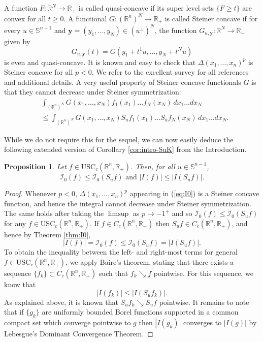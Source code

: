 \documentclass[11pt]{article}
\newtheorem{proposition}[thm]{Proposition}
\theoremstyle{definition}
\theoremstyle{proof}
\DeclareMathOperator{\+}{\mathop{\tilde{+}}}
\newcommand{\R}{\mathbb{R}}
\renewcommand{\S}{\mathbb{S}}
\newcommand{\I}{\mathcal{I}}
\newcommand{\y}{\mathbf{y}}
\newcommand{\usc}{\textrm{USC}}
\numberwithin{equation}{section}
\numberwithin{equation}{section}
\begin{document}
\smallskip

A function $F : \R^N \rightarrow \R_+$ is called quasi-concave if its super level sets $\{F \geq t\}$ are convex for all $t \geq 0$. 
A functional $G : (\R^n)^N \rightarrow \R_+$ is called Steiner concave if for every $u \in \S^{n-1}$ and $\y = (y_1,\ldots,y_N) \in (u^{\perp})^N$, the function $G_{u,\y} : \R^N \rightarrow \R_+$ given by
\[
G_{u,\y}(t) = G(y_1 + t^1 u,\ldots, y_N + t^N u) 
\]
is even and quasi-concave. It is known and easy to check that $\Delta(x_1,\ldots,x_n)^p$ is Steiner concave for all $p < 0$. We refer to the excellent survey \cite{PaourisPivovarov-Survey} for all references and additional details. 
A very useful property of Steiner concave functionals $G$ is that they cannot decrease under Steiner symmetrization:
\begin{align*}
& \int_{(\R^n)^N} G(x_1,\ldots,x_N) f_1(x_1)\ldots f_N(x_N) \, dx_1 \ldots dx_N \\
& \leq \int_{(\R^n)^N} G(x_1,\ldots,x_N) S_u f_1(x_1)\ldots S_u f_N(x_N) \, dx_1 \ldots dx_N  . 
\end{align*}

While we do not require this for the sequel, we can now easily deduce the following extended version of Corollary \ref{cor:intro-SuK} from the Introduction.\begin{proposition}
Let $f \in \usc_c(\R^n,\R_+)$. Then, for all $u \in \S^{n-1}$,
\[
\overline{\I}_0(f) \leq \overline{\I}_0(S_u f) \text{ and } |I(f)| \leq |I(S_u f)|.
\] 
\end{proposition} 
\begin{proof}
Whenever $p < 0$, $\Delta(x_1,\ldots,x_n)^p$  appearing in (\ref{eq:I0}) is a Steiner concave function, and hence the integral cannot decrease under Steiner symmetrization. The same holds after taking the $\limsup$ as $p \rightarrow -1^+$ and so $\overline{\I}_0(f) \leq \overline{\I}_0(S_u f)$ for any $f \in \usc_c(\R^n, \R_+)$. If $f \in C_c(\R^n,\R_+)$ then $S_u f \in C_c(\R^n,\R_+)$, and hence by Theorem \ref{thm:I0},
\[
|I(f)| = \I_0(f) \leq   \I_0(S_u f) = |I(S_u f)| . \]
To obtain the inequality between the left- and right-most terms for general $f \in \usc_c(\R^n, \R_+)$, we apply Baire's theorem, stating that there exists a sequence $\{f_k\} \subset C_c(\R^n, \R_+)$ such that
$f_k \searrow f$ pointwise. For this sequence, we know that
\[
|I(f_k)| \leq |I(S_u f_k)| . 
\]
As explained above, it is known that $S_u f_k \searrow S_u f$ pointwise. It remains to note that if $\{g_k\}$ are uniformly bounded Borel functions supported in a common compact set which converge pointwise to $g$ then $|I(g_k)|$ converges to $|I(g)|$ by Lebesgue's Dominant Convergence Theorem.
\end{proof}
\end{document}
